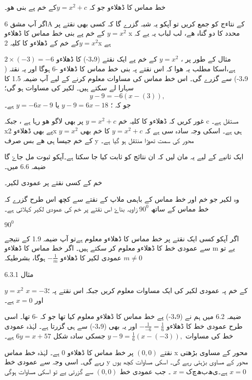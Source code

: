 خط مماس کا ڈھلاءو جو کہ  \( y=x^{2} +c \)کے خم پے بنی ھو۔


اگر آپ مشق 6A کے نتاءج کو جمع کریں تو آپکو یہ شبہ گزرے گا کہ کسی بھی نقتے پر\( y=x^{2}\) کے خم پے بنی خط مماس کا ڈھلاءو x محدد کا دو گناہ ھے، لب لباب یہ یے کہ \( y=x^{2}\)کے خم کے ڈھلاءو کا کلیہ 2x     ہے  

مثال کے طور پر ،  \( y=x^{2}\) کے  خم پے  ایک نقتے (3،9-) کا ڈھلاءو \( 2 \times (-3) =-6 \) ہے،اسکا مطلب یہ ھوا کہ اس نقتے پہ بنی خط مماس کا ڈھلاءو -6 ہوگا اور یہ نقتہ    ( 3،9-)  سے گزرے گی۔
اس خط مماس کی مساوات معلوم کرنے کے لیے آپ ضیمہ 1.5 کا سہارا لے سکتے ہیں۔ لکیر کی مساوات ہو گی؛
\[y-9=-6(x-(3)),\]
جو کہ ؛
\(y-9 =6x-18\)
یا
\(y=-6x-9\)
ہے۔

غور کریں کہ ڈھلاءو کا کلیہ  خم \( y=x^{2} +c \) پر بھی لاگو ھو رہا ہے ، جبکہ c مستقل ہے۔ xپے بھی ڈھلاءو 2x ہی ہے۔ اسکی وجہ سادہ سی ہے کہ  \( y=x^{2} +c \) کا خم بھی  \( y=x^{2}  \)  کے خم جیسا ہی ھے بس صرف   y
محور کی سمت تھوڑا منتقل ہو گیا ہے۔

ایک ثانیے کے لیے یہ مان لیں کہ ان نتائج کو ثابت کیا جا سکتا ہے۔آپکو ثبوت مل جاۓ گا ضیمہ 6.6 میں۔

خم کے کسی نقتے پر عمودی لکیر۔

وہ لکیر جو خم اور خط مماس کے باہمی ملاپ کے نقتے سے کچھ اس طرح گزرے کہ خط مماس کے ساتھ  \( 90^0\) زاویہ بناۓ  اس نقتے پر خم کی عمودی لکیر کہلاتی ہے۔

\( 90^0\)




اگر آپکو کسی ایک نقتے پر خط مماس کا ڈھلاءو  معلوم ہےتو آپ ضیمہ 1.9 کے نتیجے سے  عمودی خط کا ڈھلاءو معلوم کر سکتے ہیں۔ اگر خط مماس کا ڈھلاءو  m
یے تو عمودی لکیر کا ڈھلاءو \(- \frac{1}{m}\) ہوگا، بشرطیکہ \(m \ne 0\)

مثال 6.3.1
  
 \( y=x^{2} \)   
 کے خم پہ  عمودی لکیر کی ایک مساوات معلوم کریں جبکہ اس نقتے پہ ؛\(x=-3\) اور \(x=0\)  ہے۔

ضیمہ 6.2 میں ہم نے (3،9-) پے خط مماس  کا ڈھلاءو معلوم کیا تھا جو کہ -6  تھا۔ اسی طرح عمودی خط کا ڈھلاءو \(-\frac{1}{-6} =\frac{1}{6}\) اور یہ بھی (3،9-) سے ہی گزرتا ہے۔ لہٰذہ عمودی خط کی مساوات \( y-9=\frac{1}{6}(x-(-3)),\) جسکی سادہ شکل
\( 6y=x+57\)
ہے۔

نقتے \( (0,0)\)  پر خط مماس کا ڈھلاءو  0 ہے۔ لہٰذہ  خط مماس x محور کے مساوی بڑھتی رہے گی۔ اسی وجہ سے عمودی خط y محور کے مساوی بڑہتی رہے گی۔ اسکی مساوات کچھ یوں ہے۔\(x= کچھ بھی \)   ۔ جب عمودی خط \( (0,0)\)  سے گزرتی یے تو اسکی  مساوات ہوگی \(x= 0 \) 

